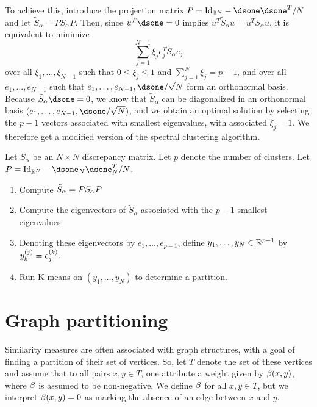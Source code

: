 To achieve this, introduce the projection matrix $P = \Id[N] - \dsone\dsone^T/N$ and let $\tilde S_\alpha = PS_\alpha P$. Then, since $u^T\dsone = 0$ implies $u^T\tilde S_\alpha u = u^TS_\alpha u$, it is equivalent to minimize
\[
\sum_{j=1}^{N-1} \xi_j e_j^T \tilde S_\alpha e_j 
\]
over all $\xi_1, \ldots, \xi_{N-1}$ such that $0\leq \xi_j \leq 1$ and $\sum_{j=1}^N \xi_j = p-1$, and over all $e_1, \ldots, e_{N-1}$ such that $e_1, \ldots, e_{N-1}, \dsone/\sqrt N$ form an orthonormal basis. Because $\tilde S_\alpha \dsone = 0$, we know that $\tilde S_\alpha$ can be diagonalized in an orthonormal basis $(e_1, \ldots, e_{N-1}, \dsone/\sqrt N)$, and we obtain an optimal solution by selecting the $p-1$ vectors associated with smallest eigenvalues, with associated $\xi_j = 1$. We therefore get a modified version of the spectral clustering algorithm.
\begin{algorithm}
\label{alg:sc.v2}
Let $S_\alpha$ be an $N\times N$ discrepancy matrix. Let $p$ denote the number of clusters. Let $P = \Id[N] - \dsone_N\dsone_N^T/N$.
\begin{enumerate}
\item Compute $\tilde S_\alpha = PS_\alpha P$
\item Compute the eigenvectors of $\tilde S_\alpha$ associated with the $p-1$ smallest eigenvalues.
\item Denoting these eigenvectors by $e_1, \ldots, e_{p-1}$, define $y_1, \ldots, y_N \in {\mathbb{R}}^{p-1}$ by $y_k^{(j)} = e_j^{(k)}$.
\item Run K-means on $(y_1, \ldots, y_N)$ to determine a partition.
\end{enumerate}
\end{algorithm}







\section{Graph partitioning}
\label{sec:graph.cluster}

Similarity measures are often associated with graph structures, with a goal of finding a partition of their set of vertices. So, let $T$ denote the set of these vertices and assume that to all pairs $x,y\in T$, one attribute  a weight given by  $\beta(x,y)$, where $\beta$ is assumed to be non-negative. We define $\beta$ for all $x,y\in T$, but we interpret $\beta(x,y) = 0$ as marking the absence of an edge between $x$ and $y$.

